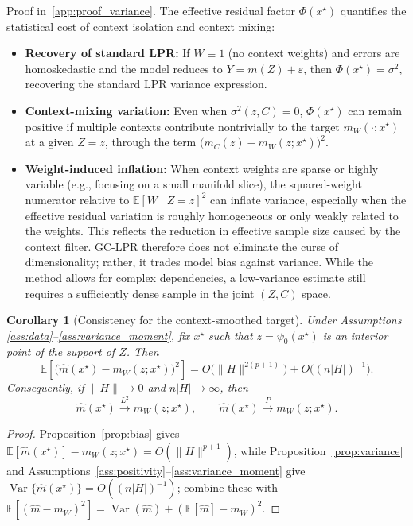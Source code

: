 \documentclass[final,1p,times,authoryear]{elsarticle}
\newtheorem{corollary}{Corollary}
\DeclareMathOperator{\Var}{Var}
\begin{document}
Proof in~\ref{app:proof_variance}. The effective residual factor \(\Phi(x^\star)\) quantifies the statistical cost of context isolation and context mixing:
\begin{itemize}
    \item \textbf{Recovery of standard LPR:} If \(W\equiv 1\) (no context weights) and errors are
    homoskedastic and the model reduces to \(Y=m(Z)+\varepsilon\), then \(\Phi(x^\star)=\sigma^2\), recovering the standard LPR variance expression.
    \item \textbf{Context-mixing variation:} Even when \(\sigma^2(z,C)=0\), \(\Phi(x^\star)\) can remain positive if multiple contexts contribute nontrivially to the target \(m_W(\cdot;x^\star)\) at a given \(Z=z\), through the term \(\big(m_C(z)-m_W(z;x^\star)\big)^2\).
    \item \textbf{Weight-induced inflation:} When context weights are sparse or highly variable (e.g., focusing on a small manifold slice), the squared-weight numerator relative to \(\mathbb{E}[W\mid Z=z]^2\) can inflate variance, especially when the effective residual variation is roughly homogeneous or only weakly related to the weights. This reflects the reduction in effective sample size caused by the context filter. GC-LPR therefore does not eliminate the curse of dimensionality; rather, it trades model bias against variance. While the method allows for complex dependencies, a low-variance estimate still requires a sufficiently dense sample in the joint $(Z,C)$ space.
\end{itemize}

\begin{corollary}[Consistency for the context-smoothed target]
\label{cor:mw_consistency}
Under Assumptions \ref{ass:data}--\ref{ass:variance_moment}, fix \(x^\star\) such that \(z=\psi_0(x^\star)\) is an interior point of the support of \(Z\). Then
\[
\mathbb{E}\!\left[\big(\hat m(x^\star)-m_W(z;x^\star)\big)^2\right]
=
O\!\big(\|H\|^{2(p+1)}\big)+O\!\big((n|H|)^{-1}\big).
\]
Consequently, if \(\|H\|\to0\) and \(n|H|\to\infty\), then
\[
\hat m(x^\star)\xrightarrow{L^2} m_W(z;x^\star),
\qquad
\hat m(x^\star)\xrightarrow{P} m_W(z;x^\star).
\]
\end{corollary}
\begin{proof}
Proposition~\ref{prop:bias} gives \(\mathbb{E}[\hat m(x^\star)]-m_W(z;x^\star)=O(\|H\|^{p+1})\), while Proposition~\ref{prop:variance} and Assumptions~\ref{ass:positivity}--\ref{ass:variance_moment} give \(\Var\{\hat m(x^\star)\}=O((n|H|)^{-1})\); combine these with \(\mathbb{E}[(\hat m-m_W)^2]=\Var(\hat m)+(\mathbb{E}[\hat m]-m_W)^2\).
\end{proof}
\end{document}
